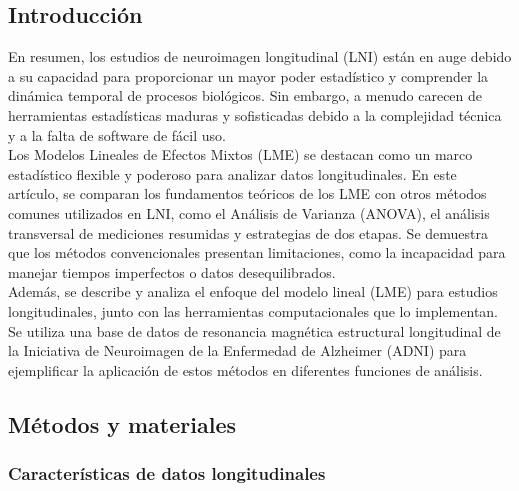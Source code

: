	
	\subsection{Introducción}
	En resumen, los estudios de neuroimagen longitudinal (LNI) están en auge debido a su capacidad para proporcionar un mayor poder estadístico y comprender la dinámica temporal de procesos biológicos. Sin embargo, a menudo carecen de herramientas estadísticas maduras y sofisticadas debido a la complejidad técnica y a la falta de software de fácil uso.\\
	
	Los Modelos Lineales de Efectos Mixtos (LME) se destacan como un marco estadístico flexible y poderoso para analizar datos longitudinales. En este artículo, se comparan los fundamentos teóricos de los LME con otros métodos comunes utilizados en LNI, como el Análisis de Varianza (ANOVA), el análisis transversal de mediciones resumidas y estrategias de dos etapas. Se demuestra que los métodos convencionales presentan limitaciones, como la incapacidad para manejar tiempos imperfectos o datos desequilibrados.\\
	
	Además, se describe y analiza el enfoque del modelo lineal (LME) para estudios longitudinales, junto con las herramientas computacionales que lo implementan. Se utiliza una base de datos de resonancia magnética estructural longitudinal de la Iniciativa de Neuroimagen de la Enfermedad de Alzheimer (ADNI) para ejemplificar la aplicación de estos métodos en diferentes funciones de análisis.\cite{bernal2013statistical}
	
	\subsection{Métodos y materiales}
	\subsubsection{Características de datos longitudinales}
	
